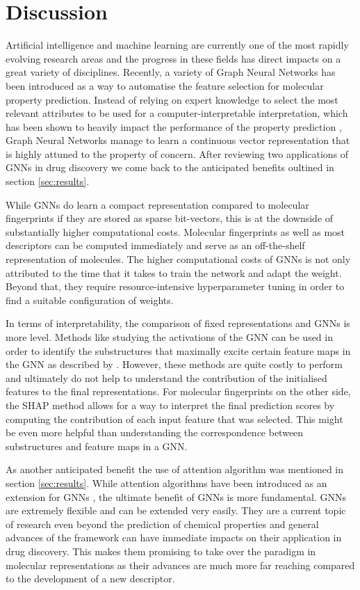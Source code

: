 \section{Discussion}
Artificial intelligence and machine learning are currently one of the most rapidly evolving research areas and the progress in these fields has direct impacts on  a great variety of disciplines. Recently, a variety of Graph Neural Networks has been introduced as a way to automatise the feature selection for molecular property prediction. Instead of relying on expert knowledge to select the most relevant attributes to be used for a computer-interpretable interpretation, which has been shown to heavily impact the performance of the property prediction \citep{tian}, Graph Neural Networks manage to learn a continuous vector representation that is highly attuned to the property of concern. After reviewing two applications of GNNs in drug discovery we come back to the anticipated benefits oultined in section \ref{sec:results}. 

While GNNs do learn a compact representation compared to molecular fingerprints if they are stored as sparse bit-vectors, this is at the downside of substantially higher computational costs. Molecular fingerprints as well as most descriptors can be computed immediately and serve as an off-the-shelf representation of molecules. The higher computational costs of GNNs is not only attributed to the time that it takes to train the network and adapt the weight. Beyond that, they require resource-intensive hyperparameter tuning in order to find a suitable configuration of weights. 

In terms of interpretability, the comparison of fixed representations and GNNs is more level. Methods like studying the activations of the GNN can be used in order to identify the substructures that maximally excite certain feature maps in the GNN as described by \cite{duvenaud2015convolutional}. However, these methods are quite costly to perform and ultimately do not help to understand the contribution of the initialised features to the final representations. For molecular fingerprints on the other side, the SHAP method \citep{lundberg2017unified} allows for a way to interpret the final prediction scores by computing the contribution of each input feature that was selected. This might be even more helpful than understanding the correspondence between substructures and feature maps in a GNN. 

As another anticipated benefit the use of attention algorithm was mentioned in section \ref{sec:results}. While attention algorithms have been introduced as an extension for GNNs \citep{graphattentionmpp}, the ultimate benefit of GNNs is more fundamental. GNNs are extremely flexible and can be extended very easily. They are a current topic of research even beyond the prediction of chemical properties and general advances of the framework can have immediate impacts on their application in drug discovery. This makes them promising to take over the paradigm in molecular representations as their advances are much more far reaching compared to the development of a new descriptor.

